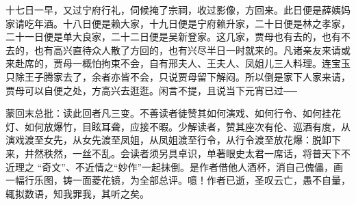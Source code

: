 \begin{parag}
    十七日一早，又过宁府行礼，伺候掩了宗祠，收过影像，方回来。此日便是薛姨妈家请吃年酒。十八日便是赖大家，十九日便是宁府赖升家，二十日便是林之孝家，二十一日便是单大良家，二十二日便是吴新登家。这几家，贾母也有去的，也有不去的，也有高兴直待众人散了方回的，也有兴尽半日一时就来的。凡诸亲友来请或来赴席的，贾母一概怕拘束不会，自有邢夫人、王夫人、凤姐儿三人料理。连宝玉只除王子腾家去了，余者亦皆不会，只说贾母留下解闷。所以倒是家下人家来请，贾母可以自便之处，方高兴去逛逛。闲言不提，且说当下元宵已过──
\end{parag}


\begin{parag}
    \begin{note}蒙回末总批：读此回者凡三变。不善读者徒赞其如何演戏、如何行令、如何挂花灯、如何放爆竹，目眩耳聋，应接不暇。少解读者，赞其座次有伦、巡酒有度，从演戏渡至女先，从女先渡至凤姐，从凤姐渡至行令，从行令渡至放花爆：脱卸下来，井然秩然，一丝不乱。会读者须另具卓识，单著眼史太君一席话，将普天下不近理之 “奇文”、不近情之“妙作”一起抹倒。是作者借他人酒杯，消自己傀儡，画一幅行乐图，铸一面菱花镜，为全部总评。噫！作者已逝，圣叹云亡，愚不自量，辄拟数语，知我罪我，其听之矣。\end{note}
\end{parag}
